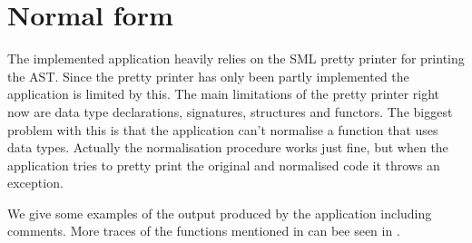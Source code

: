 \section{Normal form}
\label{sec:eval-normal-form}

The implemented  application heavily relies on the SML pretty
printer for printing the AST. Since the pretty printer has only been partly
implemented the  application is limited by this. The main
limitations of the pretty printer right now are data type declarations, signatures,
structures and functors. The biggest problem with this is that the application
can't normalise a function that uses data types. Actually the normalisation
procedure works just fine, but when the application tries to pretty print the
original and normalised code it throws an exception.

We give some examples of the output produced by the  application
including comments. More traces of the functions mentioned in
 can bee seen in .




